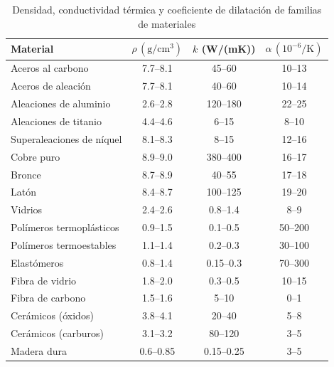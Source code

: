 \newpage

\begin{table}[htbp]
  \centering
  \small
  \caption{Densidad, conductividad térmica y coeficiente de dilatación de familias de materiales}
  \label{tab:prop_mat_fisicas_sin_costo}
  \begin{tabular}{@{} l c c c @{}}
    \toprule
    Material                  & $\rho\, \mathrm{(g/cm^{3})}$ & $k$ (W/(mK)) & $\alpha\,\mathrm{(10^{-6}/K)}$ \\
    \midrule
    Aceros al carbono         & 7.7–8.1           & 45–60               & 10–13                  \\
    Aceros de aleación        & 7.7–8.1           & 40–60               & 10–14                  \\
    Aleaciones de aluminio    & 2.6–2.8           & 120–180             & 22–25                  \\
    Aleaciones de titanio     & 4.4–4.6           & 6–15                & 8–10                   \\
    Superaleaciones de níquel & 8.1–8.3           & 8–15                & 12–16                  \\
    Cobre puro                & 8.9–9.0           & 380–400             & 16–17                  \\
    Bronce                    & 8.7–8.9           & 40–55               & 17–18                  \\
    Latón                     & 8.4–8.7           & 100–125             & 19–20                  \\
    Vidrios                   & 2.4–2.6           & 0.8–1.4             & 8–9                    \\
    Polímeros termoplásticos  & 0.9–1.5           & 0.1–0.5             & 50–200                 \\
    Polímeros termoestables   & 1.1–1.4           & 0.2–0.3             & 30–100                 \\
    Elastómeros               & 0.8–1.4           & 0.15–0.3            & 70–300                 \\
    Fibra de vidrio           & 1.8–2.0           & 0.3–0.5             & 10–15                  \\
    Fibra de carbono          & 1.5–1.6           & 5–10                & 0–1                    \\
    Cerámicos (óxidos)        & 3.8–4.1           & 20–40               & 5–8                    \\
    Cerámicos (carburos)      & 3.1–3.2           & 80–120              & 3–5                    \\
    Madera dura               & 0.6–0.85          & 0.15–0.25           & 3–5                    \\
    \bottomrule
  \end{tabular}
\end{table}

